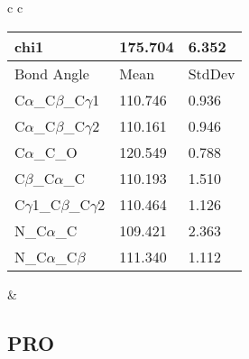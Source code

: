 \begin{longtable}{ c c }
\begin{tabular}{ l l l }
  chi1 & 175.704 & 6.352 \\ \midrule
  Bond Angle   & Mean     & StdDev \\ \midrule
  C$\alpha$\_C$\beta$\_C$\gamma$1 & 110.746 & 0.936\\
  C$\alpha$\_C$\beta$\_C$\gamma$2 & 110.161 & 0.946\\
  C$\alpha$\_C\_O & 120.549 & 0.788\\
  C$\beta$\_C$\alpha$\_C & 110.193 & 1.510\\
  C$\gamma$1\_C$\beta$\_C$\gamma$2 & 110.464 & 1.126\\
  N\_C$\alpha$\_C & 109.421 & 2.363\\
  N\_C$\alpha$\_C$\beta$ & 111.340 & 1.112\\
  \bottomrule
  \end{tabular}
  &
  \\
  
\end{longtable}    

\newpage
\subsection{PRO}


